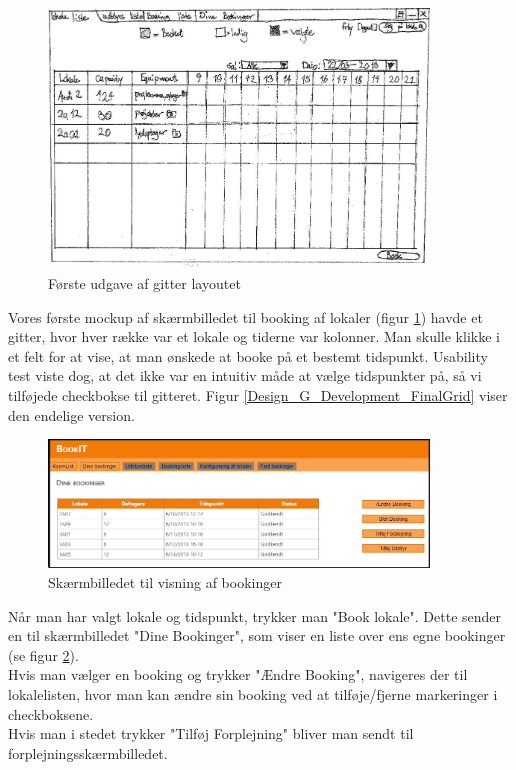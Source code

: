 \begin{figure}[h!]
  \centering
    \includegraphics[width=0.9\textwidth]{Appendix/GUI-Prototype/PaperMockup/LokaleListe_001}
  \caption{Første udgave af gitter layoutet}
\label{Design_G_Development_FirstGrid}
\end{figure}

Vores første mockup af skærmbilledet til booking af lokaler (figur \ref{Design_G_Development_FirstGrid}) havde et gitter, hvor hver række var et lokale og tiderne var kolonner. Man skulle klikke i et felt for at vise, at man ønskede at booke på et bestemt tidspunkt. Usability test viste dog, at det ikke var en intuitiv måde at vælge tidspunkter på, så vi tilføjede checkbokse til gitteret.
Figur \ref{Design_G_Development_FinalGrid} viser den endelige version.

\begin{figure}[h!]
  \centering
    \includegraphics[width=0.9\textwidth]{Appendix/GUI-Prototype/DigitalMockup/DineBookinger}
  \caption{Skærmbilledet til visning af bookinger}
\label{Design_G_Development_YourBookings_Final}
\end{figure} 

Når man har valgt lokale og tidspunkt, trykker man "Book lokale". Dette sender en til skærmbilledet "Dine Bookinger", som viser en liste over ens egne bookinger (se figur \ref{Design_G_Development_YourBookings_Final}). 
\\Hvis man vælger en booking og trykker "Ændre Booking", navigeres der til lokalelisten, hvor man kan ændre sin booking ved at tilføje/fjerne markeringer i checkboksene. 
\\Hvis man i stedet trykker "Tilføj Forplejning" bliver man sendt til forplejningsskærmbilledet.

